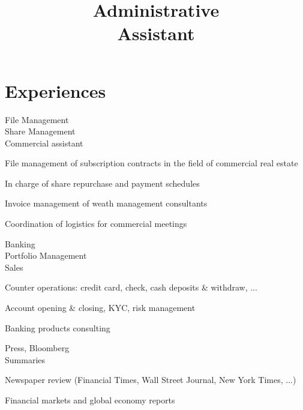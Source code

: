 \documentclass[a4paper,11pt]{cv4tw}%
\title{Administrative\\Assistant}
\begin{document}



	\section{Experiences}

	{File Management\\Share Management\\Commercial assistant}
		{ 
		\begin{missions}
			\item File management of subscription contracts in the field of commercial real estate
			\item In charge of share repurchase and payment schedules
			\item Invoice management of weath management consultants
			\item Coordination of logistics for commercial meetings
		\end{missions}
	}

	{Banking\\Portfolio Management\\Sales}
		{ 
		\begin{missions}
			\item Counter operations: credit card, check, cash deposits \& withdraw, ...
			\item Account opening \& closing, KYC, risk management
			\item Banking products consulting
		\end{missions}
	}

	{Press, Bloomberg\\Summaries}
		{
		\begin{missions}
			\item Newspaper review (Financial Times, Wall Street Journal, New York Times, ...)
			\item Financial markets and global economy reports
		\end{missions}
	}
\end{document}
